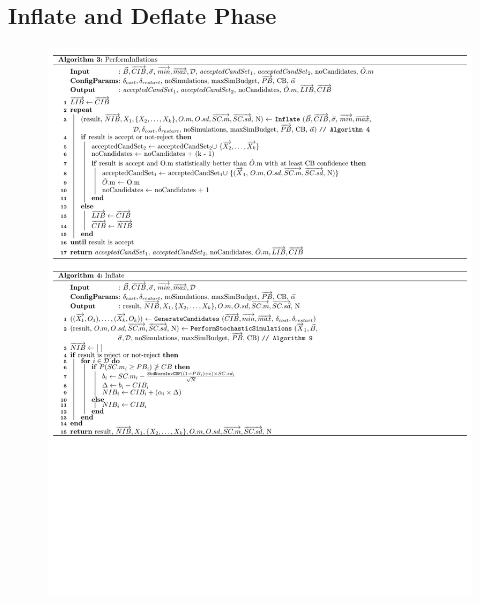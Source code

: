 \documentclass[a4paper, 12pt]{article} %
\begin{document}
\subsection{Inflate and Deflate Phase}
\label{ssec:inflDefl}
\begin{figure}
\begin{minipage}[t]{.48\textwidth}
	\begin{center}
	\includegraphics[width=1\textwidth]{pseudoCode/Algo3-4.pdf}
	\end{center}
\end{minipage}
\hfill
\begin{minipage}[t]{.5\textwidth}
		\begin{center}

\end{center}
\end{minipage}
\end{figure}
\end{document}
